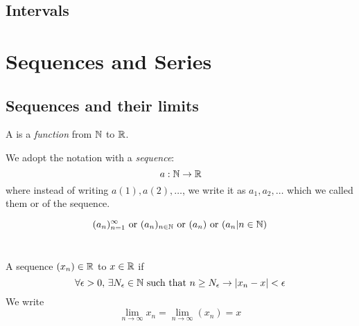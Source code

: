 \documentclass[a4paper,12pt]{article}
\begin{document}
\newpage
\subsection{Intervals}

\newpage
\section{Sequences and Series}
\subsection{Sequences and their limits}

\begin{definition}
    A  is a \textit{function} from $\mathbb{N}$ to $\mathbb{R}$.
\end{definition}
\begin{center}
\end{center}

We adopt the notation with a \textit{sequence}:
\[\,a:\mathbb{N}\rightarrow\mathbb{R}\]
where instead of writing \(a(1), a(2), \dots\), we write it as \(a_1, a_2, \dots\) which we called them 
 or  of the sequence.\\

\begin{notation}

\[(a_n)_{n=1}^\infty  \text{ or }  (a_n)_{n\in\mathbb{N}}  \text{ or }  (a_n)  \text{ or }  (a_n|n\in \mathbb{N})\]\\
\end{notation}

\begin{definition}
    A sequence \((x_n)\in\mathbb{R}\)  to \(x\in\mathbb{R}\) if 
    \[\forall \epsilon >0,\, \exists N_\epsilon \in \mathbb{N} \text{ such that }n\ge N_\epsilon \rightarrow\left\lvert x_n - x\right\rvert <\epsilon\]
    We write \[\lim_{n\to\infty}x_n = \lim_{n\to\infty}(x_n) = x\]\\
\end{definition}
\end{document}
